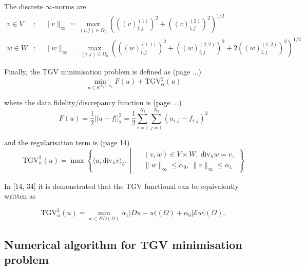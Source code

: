 The discrete $\infty\text{-norms}$ are
\begin{equation}
    \begin{aligned}
    v \in V &: \quad \|v\|_\infty = \max_{(i,j) \in \Omega_h} \left( \left( (v)_{i,j}^{(1)} \right)^{2} + \left( (v)_{i,j}^{(2)} \right)^{2} \right)^{1/2} \\
    w \in W &: \quad \|w\|_\infty = \max_{(i,j) \in \Omega_h} \left( \left( (w)_{i,j}^{(1,1)} \right)^{2} + \left( (w)_{i,j}^{(2,2)} \right)^{2} + 2 \left( (w)_{i,j}^{(1,2)} \right)^{2} \right)^{1/2}
\end{aligned}
\end{equation}


Finally, the TGV minimisation problem
is defined as (page ...)
\begin{equation}
    \min_{u \in \mathbb{R}^{N_1 \times N_2}} F(u) + \mathrm{TGV}^2_\alpha(u)
    \label{eq:tgv_minimisation_problem}
\end{equation}

where
the data fidelity/discrepancy function is (page ...)
\begin{equation}
    F(u) = \frac{1}{2} || u - f ||^2_2 = 
    \frac{1}{2}
    \sum_{i=1}^{N_1} \sum_{j=1}^{N_2} (u_{i,j} - f_{i,j})^2
    \label{eq:data_fidelity_term}
\end{equation}

and
the regularisation term is (page 14)
\begin{equation}
    \mathrm{TGV}^2_\alpha(u) = \max \left\{ \langle u, \mathrm{div}_h v \rangle_U \ \middle| \ 
    \begin{aligned}
    &(v, w) \in V \times W, \ \mathrm{div}_h w = v, \\
    &\|w\|_\infty \leq \alpha_0, \ \|v\|_\infty \leq \alpha_1 
    \end{aligned}
    \right\}
\end{equation}

In [14, 34] it is demonstrated that the TGV functional can be equivalently written as

\begin{equation}
    \text{TGV}^2_{\alpha}(u) = \min_{w \in BD(\Omega)} \alpha_1 \lvert Du - w \rvert (\Omega) + \alpha_0 \lvert \mathcal{E} w \rvert (\Omega),
\end{equation}
    




\subsection{
Numerical
algorithm for TGV minimisation problem
}

